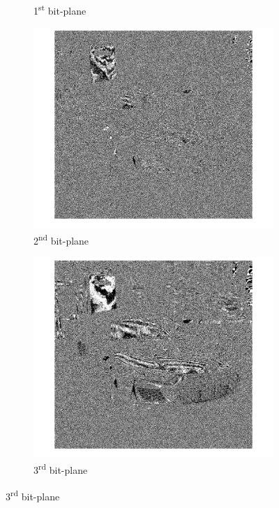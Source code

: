 \documentclass[conference]{IEEEtran}
\begin{document}
\begin{figure}[h!]
\begin{subfigure}[b]{0.3\linewidth}
\caption{1\textsuperscript{st} bit-plane}
\end{subfigure}
\begin{subfigure}[b]{0.3\linewidth}
\includegraphics[width=\linewidth]{images/img5.jpg}
\caption{2\textsuperscript{nd} bit-plane}
\end{subfigure}
\begin{subfigure}[b]{0.3\linewidth}
\includegraphics[width=\linewidth]{images/img6.jpg}
\caption{3\textsuperscript{rd} bit-plane}
\end{subfigure}

\end{figure}
\end{document}
